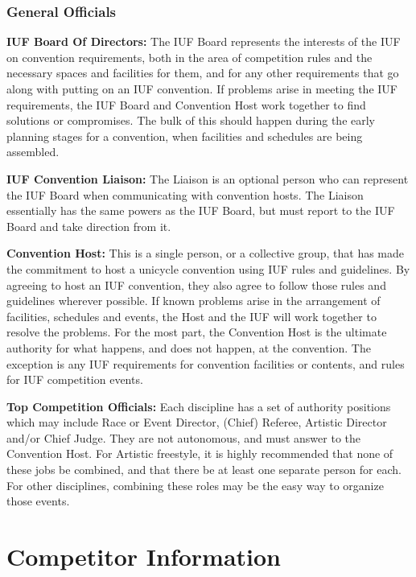 \subsection{General Officials}

\textbf{IUF Board Of Directors:} The IUF Board represents the interests of the IUF on convention requirements, both in the area of competition rules and the necessary spaces and facilities for them, and for any other requirements that go along with putting on an IUF convention.
If problems arise in meeting the IUF requirements, the IUF Board and Convention Host work together to find solutions or compromises.
The bulk of this should happen during the early planning stages for a convention, when facilities and schedules are being assembled.

\textbf{IUF Convention Liaison:} The Liaison is an optional person who can represent the IUF Board when communicating with convention hosts.
The Liaison essentially has the same powers as the IUF Board, but must report to the IUF Board and take direction from it.

\textbf{Convention Host:} This is a single person, or a collective group, that has made the commitment to host a unicycle convention using IUF rules and guidelines.
By agreeing to host an IUF convention, they also agree to follow those rules and guidelines wherever possible.
If known problems arise in the arrangement of facilities, schedules and events, the Host and the IUF will work together to resolve the problems.
For the most part, the Convention Host is the ultimate authority for what happens, and does not happen, at the convention.
The exception is any IUF requirements for convention facilities or contents, and rules for IUF competition events.

\textbf{Top Competition Officials:} Each discipline has a set of authority positions which may include Race or Event Director, (Chief) Referee, Artistic Director and/or Chief Judge.
They are not autonomous, and must answer to the Convention Host.
For Artistic freestyle, it is highly recommended that none of these jobs be combined, and that there be at least one separate person for each.
For other disciplines, combining these roles may be the easy way to organize those events.

\chapter{Competitor Information}

